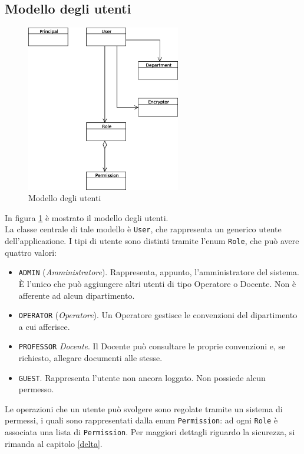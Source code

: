 \subsection{Modello degli utenti}

\begin{figure}[h]
	\centering
	\includegraphics[width=0.6\textwidth]{user_model.eps}
	\caption{Modello degli utenti}
	\label{user_model}
\end{figure}

In figura \ref{user_model} è mostrato il modello degli utenti. \\
La classe centrale di tale modello è \texttt{User}, che rappresenta un generico utente dell'applicazione. I tipi di utente sono distinti tramite l'enum \texttt{Role}, che può avere quattro valori:

\begin{itemize}
\item \texttt{ADMIN} (\textsl{Amministratore}). Rappresenta, appunto, l'amministratore del sistema. È l'unico che può aggiungere altri utenti di tipo Operatore o Docente. Non è afferente ad alcun dipartimento.
\item \texttt{OPERATOR} (\textsl{Operatore}). Un Operatore gestisce le convenzioni del dipartimento a cui afferisce.
\item \texttt{PROFESSOR} \textsl{Docente}. Il Docente può consultare le proprie convenzioni e, se richiesto, allegare documenti alle stesse.
\item \texttt{GUEST}. Rappresenta l'utente non ancora loggato. Non possiede alcun permesso.
\end{itemize}

Le operazioni che un utente può svolgere sono regolate tramite un sistema di permessi, i quali sono rappresentati dalla enum \texttt{Permission}: ad ogni \texttt{Role} è associata una lista di \texttt{Permission}. Per maggiori dettagli riguardo la sicurezza, si rimanda al capitolo \ref{delta}.\\

